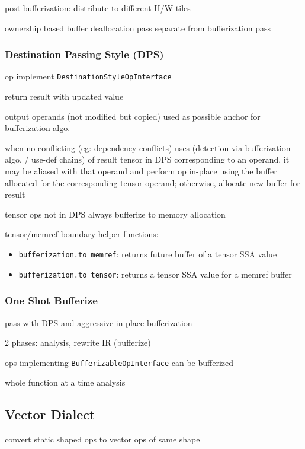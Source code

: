 \documentclass[8pt]{extarticle}
\begin{document}
\begin{multicols*}{2}
post-bufferization: distribute to different H/W tiles

ownership based buffer deallocation pass separate from bufferization pass

\subsubsection{Destination Passing Style (DPS)}

op implement \verb|DestinationStyleOpInterface|

return result with updated value

output operands (not modified but copied) used as possible anchor for bufferization algo.

when no conflicting (eg: dependency conflicts) uses (detection via bufferization algo. / use-def chains) of result tensor in DPS corresponding to an operand, it may be aliased with that operand and perform op in-place using the buffer allocated for the corresponding tensor operand; otherwise, allocate new buffer for result

tensor ops not in DPS always bufferize to memory allocation

tensor/memref boundary helper functions:
\begin{itemize}
\item \verb|bufferization.to_memref|: returns future buffer of a tensor SSA value
\item \verb|bufferization.to_tensor|: returns a tensor SSA value for a memref buffer
\end{itemize}

\subsubsection{One Shot Bufferize}
pass with DPS and aggressive in-place bufferization

2 phases: analysis, rewrite IR (bufferize)

ops implementing \verb|BufferizableOpInterface| can be bufferized

whole function at a time analysis

\vfill\null
\columnbreak

\subsection{Vector Dialect}

convert static shaped ops to vector ops of same shape


\end{multicols*}
\end{document}
